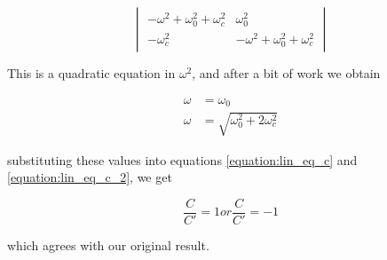 \documentclass[a4paper,10pt]{article}
\begin{document}
\begin{equation*}
\begin{vmatrix}
-\omega^2 + \omega_0^2 + \omega_c^2 & \omega_0^2 \\
-\omega_c^2 & -\omega^2 + \omega_0^2 + \omega_c^2 
\end{vmatrix}
\end{equation*}

This is a quadratic equation in $\omega^2$, and after a bit of work we obtain 

\begin{align*}
\omega &= \omega_0\\
\omega &= \sqrt{\omega_0^2 + 2\omega_c^2}
\end{align*}

substituting these values into equations \ref{equation:lin_eq_c} and \ref{equation:lin_eq_c_2}, we get

\begin{equation*}
\frac{C}{C'} = 1 or \frac{C}{C'} = -1
\end{equation*}

which agrees with our original result.
\end{document}
